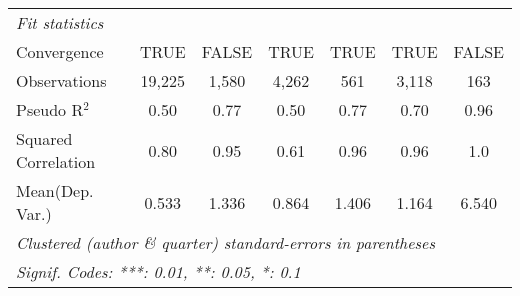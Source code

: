 \begin{tabular}{lcccccc}
   \midrule
   \emph{Fit statistics}\\
   Convergence                                                &TRUE          & FALSE         & TRUE         & TRUE          & TRUE          & FALSE\\  
   Observations                                               & 19,225       & 1,580         & 4,262        & 561           & 3,118         & 163\\  
   Pseudo R$^2$                                               & 0.50         & 0.77          & 0.50         & 0.77          & 0.70          & 0.96\\  
   Squared Correlation                                        & 0.80         & 0.95          & 0.61         & 0.96          & 0.96          & 1.0\\  
Mean(Dep. Var.) & 0.533 & 1.336 & 0.864 & 1.406 & 1.164 & 6.540 \\
   \midrule \midrule
   \multicolumn{7}{l}{\emph{Clustered (author \& quarter) standard-errors in parentheses}}\\
   \multicolumn{7}{l}{\emph{Signif. Codes: ***: 0.01, **: 0.05, *: 0.1}}\\
\end{tabular}
\par\endgroup

